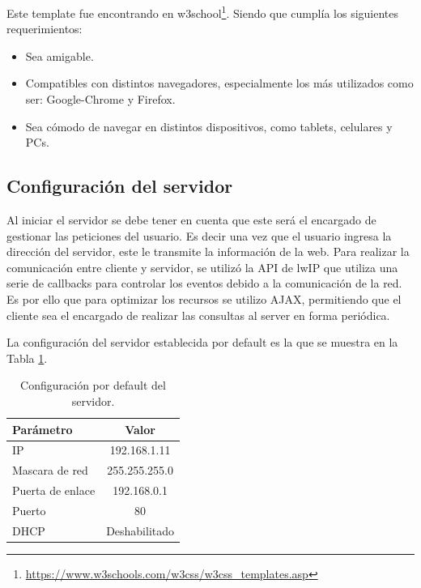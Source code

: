 Este template fue encontrando en w3school\footnote{\url{https://www.w3schools.com/w3css/w3css_templates.asp}}. Siendo que cumplía los siguientes requerimientos:
\begin{itemize}
  \item Sea amigable.
  \item Compatibles con distintos navegadores, especialmente los más utilizados como ser: Google-Chrome y Firefox. 
  \item Sea cómodo de navegar en distintos dispositivos, como tablets, celulares y PCs.
\end{itemize}


\subsection{Configuración del servidor}
Al iniciar el servidor se debe tener en cuenta que este será el encargado de gestionar las peticiones del usuario. Es decir una vez que el usuario ingresa la dirección del servidor, este le transmite la información de la web.  Para realizar la comunicación entre cliente y servidor, se utilizó la API de lwIP \citep{webserver}  que utiliza una serie de callbacks para controlar los eventos debido a la comunicación de la red. Es por ello que para optimizar los recursos se utilizo AJAX, permitiendo que el cliente sea el encargado de realizar las consultas al server en forma periódica.

La configuración del servidor establecida por default es la que se muestra en la Tabla \ref{tab:servercfg}.
\begin{table}[!h]
  \centering
  \begin{tabular}{l c}
    \hline 
    Parámetro    & Valor \\
    \hline \hline
    IP               & 192.168.1.11 \\
    Mascara de red   & 255.255.255.0 \\
    Puerta de enlace & 192.168.0.1 \\
    Puerto           & 80 \\
    DHCP             & Deshabilitado \\
    \hline
  \end{tabular}
  \caption{Configuración por default del servidor.}
  \label{tab:servercfg}
\end{table}


